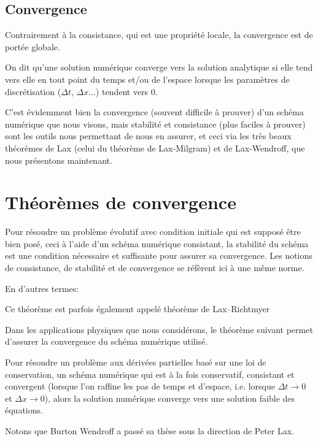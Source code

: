 \medskip
\subsection{Convergence}
Contrairement à la consistance, qui est une propriété locale, la convergence est de portée globale.

On dit qu'une solution numérique converge vers la solution analytique si elle tend vers elle en tout point du temps et/ou de l'espace lorsque les paramètres de discrétisation ($\Delta t$, $\Delta x$...) tendent vers 0.

\medskip
C'est évidemment bien la convergence (souvent difficile à prouver) d'un schéma numérique que nous visons, mais stabilité et consistance (plus faciles à prouver) sont les outils nous permettant de nous en assurer, et ceci via les très beaux théorèmes de Lax (celui du théorème de Lax-Milgram) et de Lax-Wendroff, que nous présentons maintenant.


\medskip
\section{Théorèmes de convergence}

\begin{theoreme}
Pour résoudre un problème évolutif avec condition initiale qui est supposé être bien posé, ceci à l'aide d'un schéma numérique consistant, la stabilité du schéma est une condition nécessaire et suffisante pour assurer sa convergence. Les notions de consistance, de stabilité et de convergence se réfèrent ici à une même norme.

En d'autres termes: 
\end{theoreme}
Ce théorème est parfois également appelé théorème de Lax–Richtmyer

\medskip
Dans les applications physiques que nous considérons, le théorème suivant permet d'assurer la convergence du schéma numérique utilisé.
\begin{theoreme}
Pour résoudre un problème aux dérivées partielles basé sur une loi de conservation, un schéma numérique qui est à la fois conservatif, consistant et convergent (lorsque l'on raffine les pas de temps et d'espace, i.e. lorsque $\Delta t \rightarrow 0$ et $\Delta x \rightarrow 0$), alors la solution numérique converge vers une solution faible des équations.
\end{theoreme}

Notons que Burton Wendroff a passé sa thèse sous la direction de Peter Lax.

